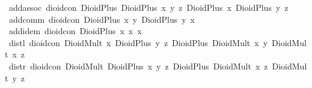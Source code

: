 \begin{isabellebody}
{}\ add{}assoc{}\ {}dioid{}con\ {}DioidPlus\ {}DioidPlus\ x\ y{}\ z{}\ {}DioidPlus\ x\ {}DioidPlus\ y\ z{}{}{}\isanewline
{}\ add{}comm{}\ {}dioid{}con\ {}DioidPlus\ x\ y{}\ {}DioidPlus\ y\ x{}{}\isanewline
{}\ add{}idem{}\ {}dioid{}con\ {}DioidPlus\ x\ x{}\ x{}\isanewline
{}\ distl{}\ {}dioid{}con\ {}DioidMult\ x\ {}DioidPlus\ y\ z{}{}\ {}DioidPlus\ {}DioidMult\ x\ y{}\ {}DioidMult\ x\ z{}{}{}\isanewline
{}\ distr{}\ {}dioid{}con\ {}DioidMult\ {}DioidPlus\ x\ y{}\ z{}\ {}DioidPlus\ {}DioidMult\ x\ z{}\ {}DioidMult\ y\ z{}{}{}\isanewline

\end{isabellebody}
